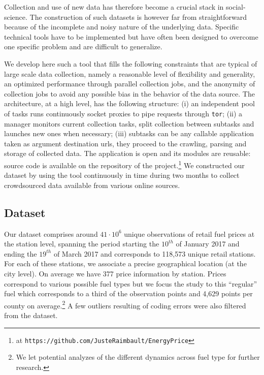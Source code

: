 \documentclass[10pt]{article}
\begin{document}
Collection and use of new data has therefore become a crucial stack in social-science. The construction of such datasets is however far from straightforward because of the incomplete and noisy nature of the underlying data. Specific technical tools have to be implemented but have often been designed to overcome one specific problem and are difficult to generalize.
 
We develop here such a tool that fills the following constraints that are typical of large scale data collection, namely a reasonable level of flexibility and generality, an optimized performance through parallel collection jobs, and the anonymity of collection jobs to avoid any possible bias in the behavior of the data source. The architecture, at a high level, has the following structure: (i) an independent pool of tasks runs continuously socket proxies to pipe requests through \texttt{tor}; (ii) a manager monitors current collection tasks, split collection between subtasks and launches new ones when necessary; (iii) subtasks can be any callable application taken as argument destination urls, they proceed to the crawling, parsing and storage of collected data. The application is open and its modules are reusable: source code is available on the repository of the project.\footnote{at \texttt{https://github.com/JusteRaimbault/EnergyPrice}} We constructed our dataset by using the tool continuously in time during two months to collect crowdsourced data available from various online sources.

\subsection{Dataset}

Our dataset comprises around $41\cdot 10^6$ unique observations of retail fuel prices at the station level, spanning the period starting the $10^{th}$ of January 2017 and ending the $19^{th}$ of March 2017 and corresponds to 118,573 unique retail stations. For each of these stations, we associate a precise geographical location (at the city level). On average we have 377 price information by station. Prices correspond to various possible fuel types but we focus the study to this ``regular'' fuel which corresponds to a third of the observation points and 4,629 points per county on average.\footnote{We let potential analyzes of the different dynamics across fuel type for further research.} A few outliers resulting of coding errors were also filtered from the dataset.
\end{document}
